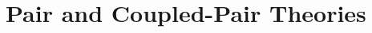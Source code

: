 \documentclass[UTF8]{ctexart}
\begin{document}
	\subsection{}
	
	\subsection{}
	
	\subsection{}
	
	\subsection{}
	
	\subsection{}
	
	\subsection{}
	
	\subsection{}
	
	\subsection{}
	
	\subsection{}
	
	\subsection{}
	

\section{Pair and Coupled-Pair Theories}
	\subsection{}
	
	\subsection{}
	
\end{document}
